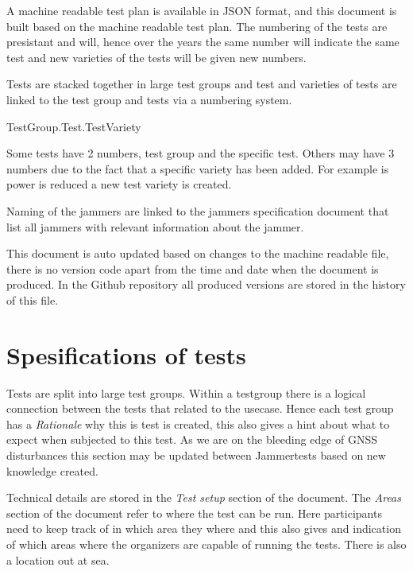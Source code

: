 \documentclass{book}
\begin{document}
A machine readable test plan is available in JSON format, and this document is built based on the machine readable test plan. The numbering of the tests are presistant and will, hence over the years the same number will indicate the same test and new varieties of the tests will be given new numbers.

Tests are stacked together in large test groups and test and varieties of tests are linked to the test group and tests via a numbering system.

TestGroup.Test.TestVariety

Some tests have 2 numbers, test group and the specific test. Others may have 3 numbers due to the fact that a specific variety has been added. For example is power is reduced a new test variety is created.


Naming of the jammers are linked to the jammers specification document that list all jammers with relevant information about the jammer.

This document is auto updated based on changes to the machine readable file, there is no version code apart from the time and date when the document is produced. In the Github repository all produced versions are stored in the history of this file.

\section{Spesifications of tests}
Tests are split into large test groups. Within a testgroup there is a logical connection between the tests that related to the usecase. Hence each test group has a \textit{Rationale} why this is test is created, this also gives a hint about what to expect when subjected to this test. As we are on the bleeding edge of GNSS disturbances this section may be updated between Jammertests based on new knowledge created. 

Technical details are stored in the \textit{Test setup} section of the document. The \textit{Areas} section of the document refer to where the test can be run. Here participants need to keep track of in which area they where and this also gives and indication of which areas where the organizers are capable of running the tests. There is also a location out at sea.
\end{document}
